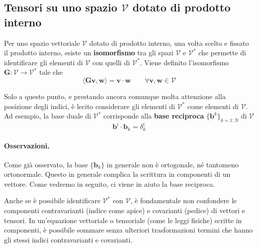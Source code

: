  
 
 


 \subsection{Tensori su uno spazio $\mathcal{V}$ dotato di prodotto interno}
 Per uno spazio vettoriale $\mathcal{V}$ dotato di prodotto interno, una volta scelto e fissato il prodotto
 interno, esiste un \textbf{isomorfismo} tra gli spazi $\mathcal{V}$ e $\mathcal{V}^*$ che permette di identificare
 gli elementi di $\mathcal{V}$ con quelli di $\mathcal{V}^*$.
 Viene definito l'isomorfismo $\bm{G}: \mathcal{V} \rightarrow \mathcal{V}^*$ tale che
 \begin{equation}
   \langle \bm{G}\bm{v}, \bm{w} \rangle = \bm{v} \cdot \bm{w} \qquad \forall \bm{v},\bm{w} \in \mathcal{V}
 \end{equation}
 
 Solo a questo punto, e prestando ancora comunque molta attenzione alla posizione degli indici, è lecito 
 considerare gli elementi di $\mathcal{V}^*$ come elementi di $\mathcal{V}$. Ad esempio, la base duale
 di $\mathcal{V}^*$ corrisponde alla \textbf{base reciproca} $\{ \bm{b}^k \}_{k=1:N}$ di $\mathcal{V}$
\begin{equation}
  \bm{b}^i \cdot \bm{b}_k  = \delta_k^i
\end{equation}
 

 \paragraph{Osservazioni.} Come già osservato, la base $\{ \bm{b}_k \}$ in generale non è
 ortogonale, né tantomeno ortonormale. Questo in generale complica la scrittura in componenti di un vettore.
 Come vedremo in seguito, ci viene in aiuto la base reciproca.
 
 Anche se è possibile identificare $\mathcal{V}^*$ con $\mathcal{V}$, è fondamentale non confondere
 le componenti contravarianti (indice come apice) e covarianti (pedice) di vettori e tensori.
 In un'equazione vettoriale o tensoriale (come le leggi fisiche) scritte in componenti, è possibile sommare 
 senza ulteriori trasformazioni termini che hanno gli stessi indici contravarianti e covarianti. 
 
